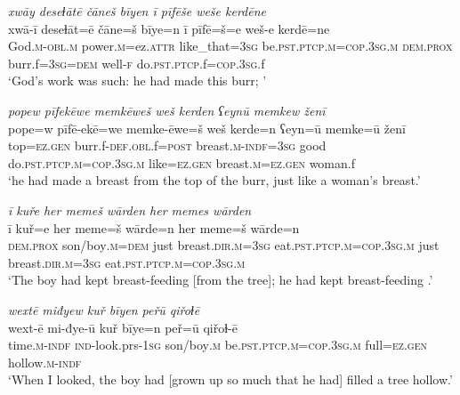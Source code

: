 \ea \label{ZQ.42}
\textit{xwāy deseɫātē čāneš bīyen ī pīfēše weše kerdēne} \\ 
\gll xwā-ī deseɫāt=ē čāne=š bīye=n ī pīfē=š=e weš-e kerdē=ne \\ 
 God\textsc{.m}\textsc{-obl}\textsc{.m} power\textsc{.m}=ez.\textsc{attr} like\_that\textsc{=3sg} be\textsc{.pst}\textsc{.ptcp}\textsc{.m}\textsc{=cop}\textsc{.3sg}\textsc{.m} \textsc{dem.prox} burr.f\textsc{=3sg}\textsc{=dem} well\textsc{-f} do\textsc{.pst}\textsc{.ptcp}.f\textsc{=cop}\textsc{.3sg}.f \\ 
\glt `God’s work was such: he had made this burr; '
\z 
 
\ea \label{ZQ.43}
\textit{popew pīfekēwe memkēweš weš kerden ʕeynū memkew ženī} \\ 
\gll pope=w pīfē-ekē=we memke-ēwe=š weš kerde=n ʕeyn=ū memke=ū ženī \\ 
 top\textsc{=ez.gen} burr.f\textsc{-def}\textsc{.obl}.f\textsc{=\textsc{post}} breast\textsc{.m}\textsc{-indf}\textsc{=3sg} good do\textsc{.pst}\textsc{.ptcp}\textsc{.m}\textsc{=cop}\textsc{.3sg}\textsc{.m} like\textsc{=ez.gen} breast\textsc{.m}\textsc{=ez.gen} woman.f \\ 
\glt `he had made a breast from the top of the burr, just like a woman’s breast.'
\z 
 
\ea \label{ZQ.44}
\textit{ī kuře her memeš wārden her memes wārden} \\ 
\gll ī kuř=e her meme=š wārde=n her meme=š wārde=n \\ 
 \textsc{dem.prox} son/boy\textsc{.m}\textsc{=dem} just breast\textsc{.dir}\textsc{.m}\textsc{=3sg} eat\textsc{.pst}\textsc{.ptcp}\textsc{.m}\textsc{=cop}\textsc{.3sg}\textsc{.m} just breast\textsc{.dir}\textsc{.m}\textsc{=3sg} eat\textsc{.pst}\textsc{.ptcp}\textsc{.m}\textsc{=cop}\textsc{.3sg}\textsc{.m} \\ 
\glt `The boy had kept breast-feeding [from the tree]; he had kept breast-feeding .'
\z 
 
\ea \label{ZQ.45}
\textit{wextē miđyew kuř bīyen peřū qiřoɫē} \\ 
\gll wext-ē mi-đye-ū kuř bīye=n peř=ū qiřoɫ-ē \\ 
 time\textsc{.m}\textsc{-indf} \textsc{ind-}look.prs\textsc{-\textsc{1sg}} son/boy\textsc{.m} be\textsc{.pst}\textsc{.ptcp}\textsc{.m}\textsc{=cop}\textsc{.3sg}\textsc{.m} full\textsc{=ez.gen} hollow\textsc{.m}\textsc{-indf} \\ 
\glt `When I looked, the boy had [grown up so much that he had] filled a tree hollow.'
\z 
 
